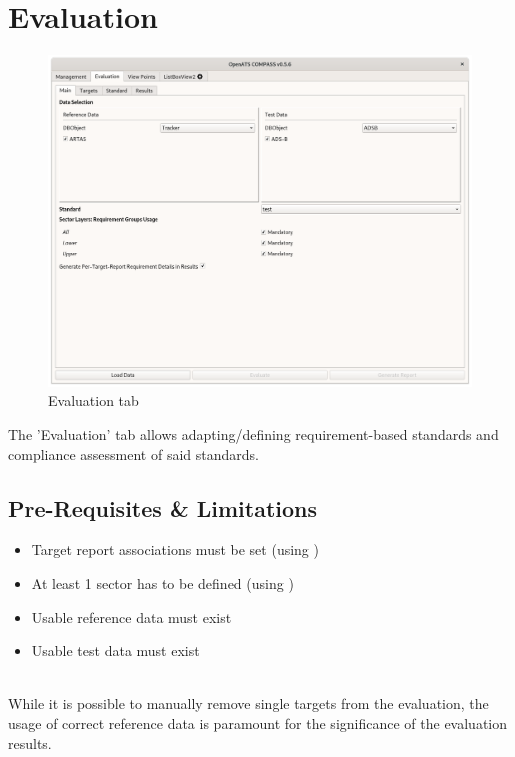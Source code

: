 \chapter{Evaluation}
\label{sec:eval} 

\begin{figure}[H]
    \hspace*{-2.5cm}
    \includegraphics[width=19cm]{../screenshots/evaluation.png}
  \caption{Evaluation tab}
\end{figure}

The 'Evaluation' tab allows adapting/defining requirement-based standards  and compliance assessment of said standards. \\

\section{Pre-Requisites \& Limitations}
\label{sec:eval_prereq} 

\begin{itemize}  
\item Target report associations must be set (using )
\item At least 1 sector has to be defined (using )
\item Usable reference data must exist
\item Usable test data must exist
\end{itemize}
\ \\

While it is possible to manually remove single targets from the evaluation, the usage of correct reference data is paramount for the significance of the evaluation results. \\

